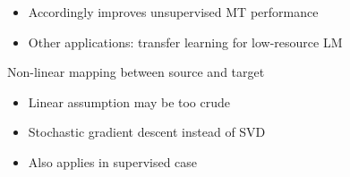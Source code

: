 \documentclass[11pt, a4paper, landscape]{article}
\begin{document}
	\begin{itemize}
		\item Accordingly improves unsupervised MT performance
		\item Other applications: transfer learning for low-resource LM \cite{adams2017cross}\\
	\end{itemize}
   

	 Non-linear mapping between source and target
	 \begin{itemize}
	 	\item Linear assumption may be too crude
	 	\item Stochastic gradient descent instead of SVD
	 	\item Also applies in supervised case
	 \end{itemize}
	\vfill

	
	

	\FinalPage
	

	
	
	\NewPage
	
	
	
\end{document}
